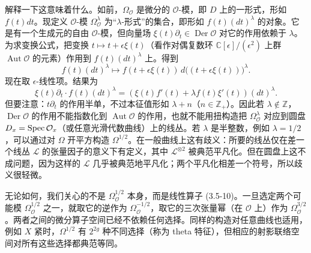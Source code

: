
解释一下这意味着什么。如前，$\Omega_{\mathcal{O}}$ 是微分的 $\mathcal{O}$-模，即 $D$ 上的一形式，形如 $f(t)dt$。现定义 $\mathcal{O}$-模 $\Omega^\lambda_{\mathcal{O}}$ 为“$\lambda$-形式”的集合，即形如 $f(t)(dt)^\lambda$ 的对象。它是有一个生成元的自由 $\mathcal{O}$-模，但向量场 $\xi(t)\partial_t\in\operatorname{Der}\mathcal{O}$ 对它的作用依赖于 $\lambda$。为求变换公式，把变换 $t\mapsto t+\epsilon\xi(t)$（看作对偶复数环 $\mathbb{C}[\epsilon]/(\epsilon^2)$ 上群 $\operatorname{Aut}\mathcal{O}$ 的元素）作用到 $f(t)(dt)^\lambda$ 上。得到
\[
    f(t)(dt)^\lambda\longmapsto f(t+\epsilon\xi(t))\,d\big((t+\epsilon\xi(t))\big)^\lambda .
\]
现在取 $\epsilon$-线性项。结果为
\[
    \xi(t)\partial_t\cdot f(t)(dt)^\lambda=(\xi(t)f'(t)+\lambda f(t)\xi'(t))(dt)^\lambda .
\]
但要注意：$t\partial_t$ 的作用半单，不过本征值形如 $\lambda+n$（$n\in\mathbb{Z}_+$）。因此若 $\lambda\notin\mathbb{Z}$，$\operatorname{Der}\mathcal{O}$ 的作用不能指数化到 $\operatorname{Aut}\mathcal{O}$ 的作用，也就不能用扭构造把 $\Omega^\lambda_{\mathcal{O}}$ 对应到圆盘 $D_x=\operatorname{Spec}\mathcal{O}_x$（或任意光滑代数曲线）上的线丛。若 $\lambda$ 是半整数，例如 $\lambda=1/2$，可以通过对 $\Omega$ 开平方构造 $\Omega^{1/2}$。在一般曲线上这有歧义：所要的线丛仅在差一个线丛 $\mathcal{L}$ 的张量因子的意义下有定义，其中 $\mathcal{L}^{\otimes 2}$ 被典范平凡化。但在圆盘上这不成问题，因为这样的 $\mathcal{L}$ 几乎被典范地平凡化；两个平凡化相差一个符号，所以歧义很轻微。

无论如何，我们关心的不是 $\Omega^{1/2}_{\mathcal{O}}$ 本身，而是线性算子 (3.5-10)。一旦选定两个可能模 $\Omega^{1/2}_{\mathcal{O}}$ 之一，就取它的逆作为 $\Omega^{-1/2}_{\mathcal{O}}$，取它的三次张量幂（在 $\mathcal{O}$ 上）作为 $\Omega^{3/2}_{\mathcal{O}}$。两者之间的微分算子空间已经不依赖任何选择。同样的构造对任意曲线也适用，例如 $X$ 紧时，$\Omega^{1/2}$ 有 $2^{2g}$ 种不同选择（称为 theta 特征），但相应的射影联络空间对所有这些选择都典范等同。

